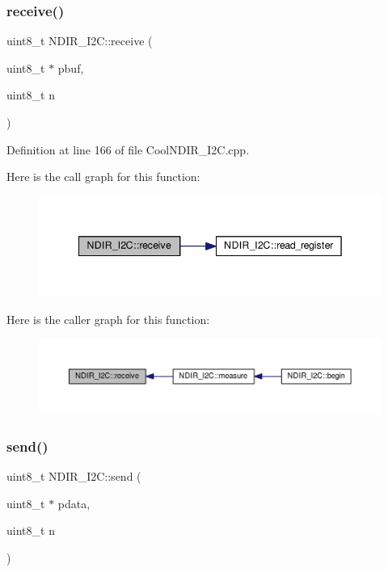 \subsubsection{\texorpdfstring{receive()}{receive()}}
{\footnotesize\ttfamily uint8\+\_\+t N\+D\+I\+R\+\_\+\+I2\+C\+::receive (\begin{DoxyParamCaption}\item[{uint8\+\_\+t $\ast$}]{pbuf,  }\item[{uint8\+\_\+t}]{n }\end{DoxyParamCaption})\hspace{0.3cm}{\ttfamily [private]}}



Definition at line 166 of file Cool\+N\+D\+I\+R\+\_\+\+I2\+C.\+cpp.

Here is the call graph for this function\+:
\nopagebreak
\begin{figure}[H]
\begin{center}
\leavevmode
\includegraphics[width=342pt]{class_n_d_i_r___i2_c_aa6d2b8dd287f9c9015461cebb18f9abc_cgraph}
\end{center}
\end{figure}
Here is the caller graph for this function\+:
\nopagebreak
\begin{figure}[H]
\begin{center}
\leavevmode
\includegraphics[width=350pt]{class_n_d_i_r___i2_c_aa6d2b8dd287f9c9015461cebb18f9abc_icgraph}
\end{center}
\end{figure}
\mbox{\label{class_n_d_i_r___i2_c_aab0c04c2b7d08e99d12af044df179f0c}} 
\subsubsection{\texorpdfstring{send()}{send()}}
{\footnotesize\ttfamily uint8\+\_\+t N\+D\+I\+R\+\_\+\+I2\+C\+::send (\begin{DoxyParamCaption}\item[{uint8\+\_\+t $\ast$}]{pdata,  }\item[{uint8\+\_\+t}]{n }\end{DoxyParamCaption})\hspace{0.3cm}{\ttfamily [private]}}



